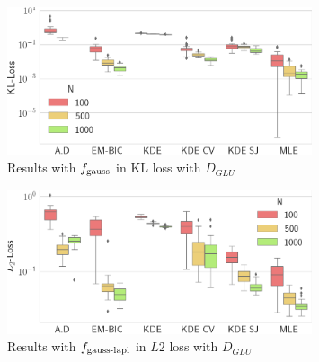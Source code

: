\begin{figure}
\center
    \includegraphics[width=0.8\textwidth]{./TeX_files/res_gauss_KL_GLU.png}
    \caption{Results with $f_{\textnormal{gauss}}$ in KL loss with $D_{GLU}$}
    \label{fig:res_gauss_KL_GLU}
\end{figure}   

\begin{figure}
\center
    \includegraphics[width=0.8\textwidth]{./TeX_files/res_lapl_gauss_L2_GLU.png}
    \caption{Results with $f_{\textnormal{gauss-lapl}}$ in $L2$ loss with $D_{GLU}$}
    \label{fig:res_lapl_gauss_L2_GLU}
\end{figure}

